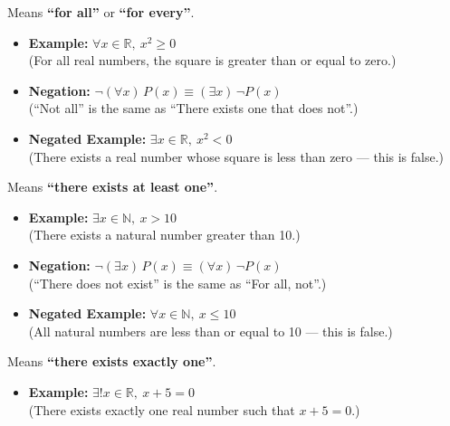 \begin{description}[leftmargin=1.5cm, labelindent=1cm, style=sameline]

\item[\textbf{Universal Quantifier:} \quad $\forall$] 
Means \textbf{``for all''} or \textbf{``for every''}.

\begin{itemize}
    \item \textbf{Example:} \quad $\forall x \in \mathbb{R},\ x^2 \geq 0$ \\
    (For all real numbers, the square is greater than or equal to zero.)
    
    \item \textbf{Negation:} \quad $\neg (\forall x)\,P(x) \equiv (\exists x)\, \neg P(x)$ \\
    (``Not all'' is the same as ``There exists one that does not''.)
    
    \item \textbf{Negated Example:} \quad $\exists x \in \mathbb{R},\ x^2 < 0$ \\
    (There exists a real number whose square is less than zero — this is false.)
\end{itemize}

\item[\textbf{Existential Quantifier:} \quad $\exists$] 
Means \textbf{``there exists at least one''}.

\begin{itemize}
    \item \textbf{Example:} \quad $\exists x \in \mathbb{N},\ x > 10$ \\
    (There exists a natural number greater than 10.)
    
    \item \textbf{Negation:} \quad $\neg (\exists x)\,P(x) \equiv (\forall x)\, \neg P(x)$ \\
    (``There does not exist'' is the same as ``For all, not''.)
    
    \item \textbf{Negated Example:} \quad $\forall x \in \mathbb{N},\ x \leq 10$ \\
    (All natural numbers are less than or equal to 10 — this is false.)
\end{itemize}

\item[\textbf{Unique Existential Quantifier:} \quad $\exists!$] 
Means \textbf{``there exists exactly one''}.

\begin{itemize}
    \item \textbf{Example:} \quad $\exists! x \in \mathbb{R},\ x + 5 = 0$ \\
    (There exists exactly one real number such that \( x + 5 = 0 \).)


\end{itemize}
\end{description}
